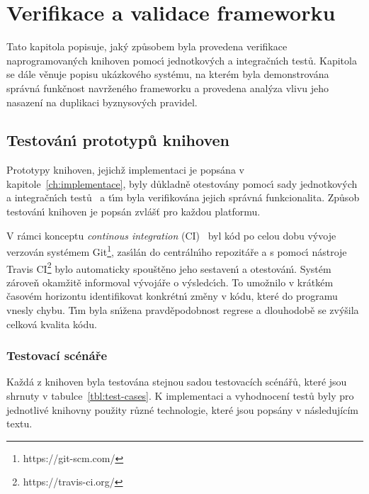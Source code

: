 

\chapter{Verifikace a validace frameworku}\label{ch:verifikace}

Tato kapitola popisuje, jak\'y způsobem byla provedena
verifikace naprogramovan\'ych knihoven pomoc\'{\i}
jednotkov\'ych a integračn\'{\i}ch testů.
Kapitola se dále věnuje popisu ukázkového systému, na kterém
byla demonstrována správná funkčnost navrženého frameworku
a provedena analýza vlivu jeho nasazení na duplikaci
byznysových pravidel.

\section{Testován\'{\i} prototypů knihoven}

Prototypy knihoven, jejichž implementaci je popsána v kapitole~\ref{ch:implementace},
byly důkladně otestovány pomoc\'{\i} sady jednotkov\'ych a integračn\'{\i}ch testů~\cite{luo2001software}
a t\'{\i}m byla verifikována jejich správná funkcionalita. Způsob
testován\'{\i} knihoven je popsán zvlášť pro každou platformu.

V rámci konceptu \textit{continous integration} (\gls{CI})~\cite{fowler2006continuous}
byl kód po celou dobu v\'yvoje verzován systémem Git\footnote{https://git-scm.com/},
zas\'{\i}lán do centráln\'{\i}ho repozitáře a s pomoc\'{\i}
nástroje Travis \gls{CI}\footnote{https://travis-ci.org/}
bylo automaticky spouštěno jeho sestaven\'{\i} a otestován\'{\i}.
Systém zároveň okamžitě informoval v\'yvojáře o v\'ysledc\'{\i}ch.
To umožnilo v krátkém časovém horizontu identifikovat konkrétn\'{\i} změny
v kódu, které do programu vnesly chybu. T\'{\i}m byla sn\'{\i}žena
pravděpodobnost regrese a dlouhodobě se zv\'yšila celková kvalita kódu.

\subsection{Testovací scénáře}

Každá z knihoven byla testována stejnou sadou testovacích scénářů, které jsou shrnuty
v tabulce~\ref{tbl:test-cases}. K implementaci a vyhodnocení testů byly pro jednotlivé
knihovny použity různé technologie, které jsou popsány v následujícím textu.

